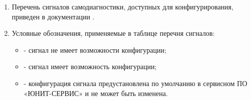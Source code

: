\areaset{267mm}{180mm}
\fancyheadoffset{0pt} %


\begin{landscape}

\setlength{\footskip}{15.5pt}

\color{black}

\begin{enumerate}[label=\ref{app:signals}.\arabic*] %
  \item Перечень сигналов самодиагностики, доступных для конфигурирования, приведен в документации \ManualUnitGeneral.
  \item Условные обозначения, применяемые в таблице перечня сигналов:
  \begin{itemize}
    \item[$\text{(--)}$] { - сигнал не имеет возможности конфигурации;}
    \item[$\text{(+)}$] { - сигнал имеет возможность конфигурации;}
    \item[$\text{(*)}$] { - конфигурация сигнала предустановлена по умолчанию в сервисном ПО «ЮНИТ-СЕРВИС» и не может быть изменена.}
  \end{itemize}
\end{enumerate}

\small %
\begin{longtable}{
>{\centering\arraybackslash}m{6.0cm}
|>{\centering\arraybackslash}m{3.45cm}
|>{\centering\arraybackslash}m{2cm}
|>{\centering\arraybackslash}m{2cm}
|>{\centering\arraybackslash}m{2cm}
|>{\centering\arraybackslash}m{2cm}
|>{\centering\arraybackslash}m{2cm}
|>{\centering\arraybackslash}m{2cm}
|>{\centering\arraybackslash}m{2.107cm}
}


\end{longtable}
\end{landscape}
